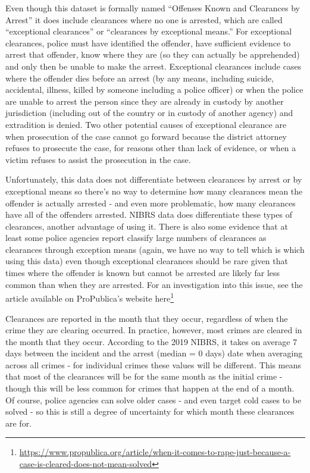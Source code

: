 \documentclass[
]{krantz}
\renewcommand{\href}[2]{#2\footnote{\url{#1}}}
\begin{document}
Even though this dataset is formally named ``Offenses Known
and Clearances by Arrest'' it does include clearances where
no one is arrested, which are called ``exceptional
clearances'' or ``clearances by exceptional means.'' For
exceptional clearances, police must have identified the
offender, have sufficient evidence to arrest that offender,
know where they are (so they can actually be apprehended)
and only then be unable to make the arrest. Exceptional
clearances include cases where the offender dies before an
arrest (by any means, including suicide, accidental,
illness, killed by someone including a police officer) or
when the police are unable to arrest the person since they
are already in custody by another jurisdiction (including
out of the country or in custody of another agency) and
extradition is denied. Two other potential causes of
exceptional clearance are when prosecution of the case
cannot go forward because the district attorney refuses to
prosecute the case, for reasons other than lack of evidence,
or when a victim refuses to assist the prosecution in the
case.

Unfortunately, this data does not differentiate between
clearances by arrest or by exceptional means so there's no
way to determine how many clearances mean the offender is
actually arrested - and even more problematic, how many
clearances have all of the offenders arrested. NIBRS data
does differentiate these types of clearances, another
advantage of using it. There is also some evidence that at
least some police agencies report classify large numbers of
clearances as clearances through exception means (again, we
have no way to tell which is which using this data) even
though exceptional clearances should be rare given that
times where the offender is known but cannot be arrested are
likely far less common than when they are arrested. For an
investigation into this issue, see the
\citet{yeung2018comes} article available on ProPublica's
website
\href{https://www.propublica.org/article/when-it-comes-to-rape-just-because-a-case-is-cleared-does-not-mean-solved}{here}

Clearances are reported in the month that they occur,
regardless of when the crime they are clearing occurred. In
practice, however, most crimes are cleared in the month that
they occur. According to the 2019 NIBRS, it takes on average
7 days between the incident and the arrest (median = 0 days)
date when averaging across all crimes - for individual
crimes these values will be different. This means that most
of the clearances will be for the same month as the initial
crime - though this will be less common for crimes that
happen at the end of a month. Of course, police agencies can
solve older cases - and even target cold cases to be solved
- so this is still a degree of uncertainty for which month
these clearances are for.
\end{document}

